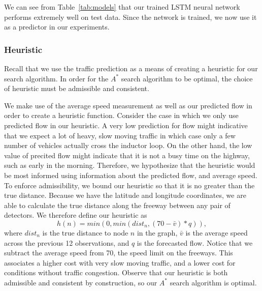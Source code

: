 \documentclass{article}
\begin{document}
We can see from Table~\ref{tab:models} that our trained LSTM neural network performs extremely well on test data. Since the network is trained, we now use it as a predictor in our experiments. 
\subsubsection{Heuristic}
Recall that we use the traffic prediction as a means of creating a heuristic for our search algorithm. In order for the $A^{*}$ search algorithm to be optimal, the choice of heuristic must be admissible and consistent.

We make use of the average speed measurement as well as our predicted flow in order to create a heuristic function. Consider the case in which we only use predicted flow in our heuristic. A very low prediction for flow might indicative that we expect a lot of heavy, slow moving traffic in which case only a few number of vehicles actually cross the inductor loop. On the other hand, the low value of precited flow might indicate that it is not a busy time on the highway, such as early in the morning. Therefore, we hypothesize that the heuristic would be most informed using information about the predicted flow, and average speed. To enforce admissibility, we bound our heuristic so that it is no greater than the true distance. Because we have the latitude and longitude coordinates, we are able to calculate the true distance along the freeway between any pair of detectors. We therefore define our heuristic as
\begin{equation}
    h(n) = min(0, min(dist_{n}, (70-\bar{v})*q)),
\end{equation}
where $dist_{n}$ is the true distance to node $n$ in the graph, $\bar{v}$ is the average speed across the previous 12 observations, and $q$ is the forecasted flow. Notice that we subtract the average speed from 70, the speed limit on the freeways. This associates a higher cost with very slow moving traffic, and a lower cost for conditions without traffic congestion. Observe that our heuristic is both admissible and consistent by construction, so our $A^{*}$ search algorithm is optimal. 
\end{document}
